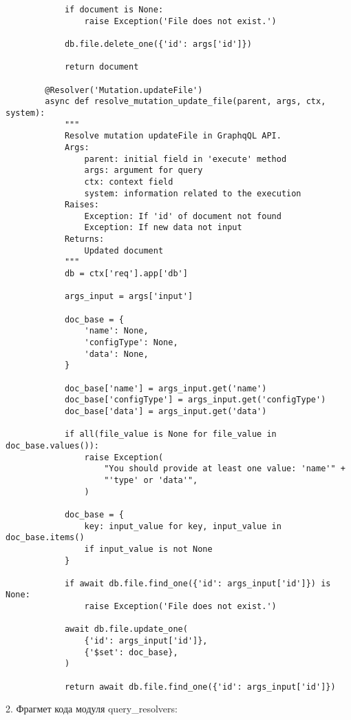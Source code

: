 \begin{Verbatim}
            if document is None:
                raise Exception('File does not exist.')

            db.file.delete_one({'id': args['id']})

            return document

        @Resolver('Mutation.updateFile')
        async def resolve_mutation_update_file(parent, args, ctx, system):
            """
            Resolve mutation updateFile in GraphqQL API.
            Args:
                parent: initial field in 'execute' method
                args: argument for query
                ctx: context field
                system: information related to the execution
            Raises:
                Exception: If 'id' of document not found
                Exception: If new data not input
            Returns:
                Updated document
            """
            db = ctx['req'].app['db']

            args_input = args['input']

            doc_base = {
                'name': None,
                'configType': None,
                'data': None,
            }

            doc_base['name'] = args_input.get('name')
            doc_base['configType'] = args_input.get('configType')
            doc_base['data'] = args_input.get('data')

            if all(file_value is None for file_value in doc_base.values()):
                raise Exception(
                    "You should provide at least one value: 'name'" +
                    "'type' or 'data'",
                )

            doc_base = {
                key: input_value for key, input_value in doc_base.items()
                if input_value is not None
            }

            if await db.file.find_one({'id': args_input['id']}) is None:
                raise Exception('File does not exist.')

            await db.file.update_one(
                {'id': args_input['id']},
                {'$set': doc_base},
            )

            return await db.file.find_one({'id': args_input['id']})
\end{Verbatim}

2. Фрагмет кода модуля query\_resolvers:

